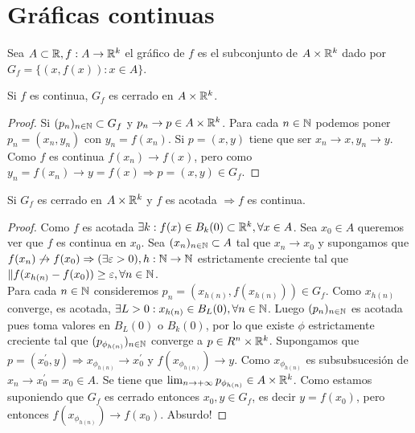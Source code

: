 \section{Gráficas continuas}

\begin{definition}
  Sea $A \subset \mathbb{R}, f: A \to \mathbb{R}^k$ el gráfico de $f$ es el subconjunto de $A \times \mathbb{R}^k$ dado por $G_f = \{ (x, f(x)) : x \in A \}$.
\end{definition}

\begin{prop}
  Si $f$ es continua, $G_f$ es cerrado en $A \times \mathbb{R}^k$.
  \begin{proof}
    Si $(p_n)_{n \in \mathbb{N}} \subset G_f$ y $p_n \to p \in A \times \mathbb{R}^k$. Para cada $n \in \mathbb{N}$ podemos poner $p_n = (x_n, y_n)$ con $y_n = f(x_n)$. Si $p = (x, y)$ tiene que ser $x_n \to x, y_n \to y$. Como $f$ es continua $f(x_n) \to f(x)$, pero como $y_n = f(x_n) \to y = f(x) \Rightarrow p = (x, y) \in G_f$.
  \end{proof}
\end{prop}

\begin{prop}
  Si $G_f$ es cerrado en $A \times \mathbb{R}^k$ y $f$ es acotada $\Rightarrow f$ es continua.
  \begin{proof}
    Como $f$ es acotada $\exists k : f(x) \in B_k(0) \subset \mathbb{R}^k, \forall x \in A$. Sea $x_0 \in A$ queremos ver que $f$ es continua en $x_0$. Sea $(x_n)_{n \in \mathbb{N}} \subset A$ tal que $x_n \to x_0$ y supongamos que $f(x_n) \not \to f(x_0) \Rightarrow (\exists \varepsilon > 0), h: \mathbb{N} \to \mathbb{N}$ estrictamente creciente tal que $\|f(x_{h(n)} - f(x_0)) \geq \varepsilon, \forall n \in \mathbb{N}$. \\
    Para cada $n \in \mathbb{N}$ consideremos $p_n = (x_{h(n)}, f(x_{h(n)})) \in G_f$. Como $x_{h(n)}$ converge, es acotada, $\exists L > 0 : x_{h(n)} \in B_L(0), \forall n \in \mathbb{N}$. Luego $(p_n)_{n \in \mathbb{N}}$ es acotada pues toma valores en $B_L(0)$ o $B_k(0)$, por lo que existe $\phi$ estrictamente creciente tal que $(p_{\phi_{h(n)}})_{n \in \mathbb{N}}$ converge a $p \in R^n \times \mathbb{R}^k$.
    Supongamos que $p = (x_0^{\prime}, y) \Rightarrow x_{\phi_{h(n)}} \to x_0^{\prime}$ y $f(x_{\phi_{h(n)}}) \to y$. Como $x_{\phi_{h(n)}}$ es subsubsucesión de $x_n \to x_0^{\prime} = x_0 \in A$. Se tiene que $\lim_{n \to +\infty} p_{\phi_{h(n)}} \in A \times \mathbb{R}^k$. Como estamos suponiendo que $G_f$ es cerrado entonces $x_0, y \in G_f$, es decir $y = f(x_0)$, pero entonces $f(x_{\phi_{h(n)}}) \to f(x_0)$. Absurdo!
  \end{proof}
\end{prop}

